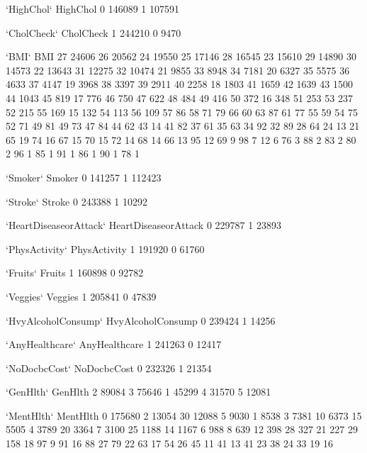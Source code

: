 \documentclass[11pt]{article}
\begin{document}
\begin{codeoutput}
`HighChol`
HighChol
0    146089
1    107591

`CholCheck`
CholCheck
1    244210
0      9470

`BMI`
BMI
27    24606
26    20562
24    19550
25    17146
28    16545
23    15610
29    14890
30    14573
22    13643
31    12275
32    10474
21     9855
33     8948
34     7181
20     6327
35     5575
36     4633
37     4147
19     3968
38     3397
39     2911
40     2258
18     1803
41     1659
42     1639
43     1500
44     1043
45      819
17      776
46      750
47      622
48      484
49      416
50      372
16      348
51      253
53      237
52      215
55      169
15      132
54      113
56      109
57       86
58       71
79       66
60       63
87       61
77       55
59       54
75       52
71       49
81       49
73       47
84       44
62       43
14       41
82       37
61       35
63       34
92       32
89       28
64       24
13       21
65       19
74       16
67       15
70       15
72       14
68       14
66       13
95       12
69        9
98        7
12        6
76        3
88        2
83        2
80        2
96        1
85        1
91        1
86        1
90        1
78        1

`Smoker`
Smoker
0    141257
1    112423

`Stroke`
Stroke
0    243388
1     10292

`HeartDiseaseorAttack`
HeartDiseaseorAttack
0    229787
1     23893

`PhysActivity`
PhysActivity
1    191920
0     61760

`Fruits`
Fruits
1    160898
0     92782

`Veggies`
Veggies
1    205841
0     47839

`HvyAlcoholConsump`
HvyAlcoholConsump
0    239424
1     14256

`AnyHealthcare`
AnyHealthcare
1    241263
0     12417

`NoDocbcCost`
NoDocbcCost
0    232326
1     21354

`GenHlth`
GenHlth
2    89084
3    75646
1    45299
4    31570
5    12081

`MentHlth`
MentHlth
0     175680
2      13054
30     12088
5       9030
1       8538
3       7381
10      6373
15      5505
4       3789
20      3364
7       3100
25      1188
14      1167
6        988
8        639
12       398
28       327
21       227
29       158
18        97
9         91
16        88
27        79
22        63
17        54
26        45
11        41
13        41
23        38
24        33
19        16


\end{codeoutput}
\end{document}
